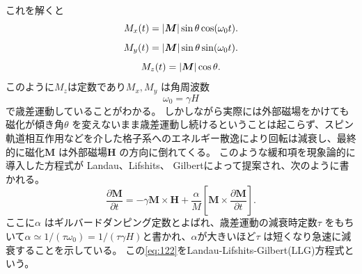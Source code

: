 \documentclass[dvipdfmx]{jsreport}
\numberwithin{equation}{chapter}
\numberwithin{table}{chapter}
\begin{document}
これを解くと
\begin{equation}
\label{eq:119}
	M_x(t)=\abs{\bm{M}}\sin \theta \cos (\omega_0 t)
.\end{equation}
\begin{equation}
\label{eq:119}
	M_y(t)=\abs{\bm{M}}\sin \theta \sin  (\omega_0 t)
.\end{equation}
\begin{equation}
\label{eq:120}
	M_z(t)=\abs{\bm{M}}\cos \theta
.\end{equation}
このように$M_z$は定数であり$M_x,M_y$ は角周波数
\begin{equation}
\label{eq:121}
	\omega_0=\gamma H
\end{equation}
で歳差運動していることがわかる。
しかしながら実際には外部磁場をかけても磁化が傾き角$\theta$ を変えないまま歳差運動し続けるということは起こらず、スピン軌道相互作用などを介した格子系へのエネルギー散逸により回転は減衰し、最終的に磁化$\bm{M}$ は外部磁場$\bm{H}$ の方向に倒れてくる。
このような緩和項を現象論的に導入した方程式が Landau、Lifshits、 Gilbertによって提案され、次のように書かれる。
\begin{equation}
\label{eq:122}
	\frac{\partial \bm{M}}{\partial t} =-\gamma \bm{M}\times \bm{H}+\frac{\alpha}{M}\left[ \bm{M}\times \frac{\partial \bm{M}}{\partial t}  \right] 
.\end{equation}
ここに$\alpha$ はギルバードダンピング定数とよばれ、歳差運動の減衰時定数$\tau$ をもちいて$\alpha\simeq 1 /(\tau\omega_0)=1 /(\tau\gamma H)$\cite{alma9926360528104034}と書かれ、$\alpha$が大きいほど$\tau$ は短くなり急速に減衰することを示している。
この\eqref{eq:122}をLandau-Lifshits-Gilbert(LLG)方程式という。
\end{document}
